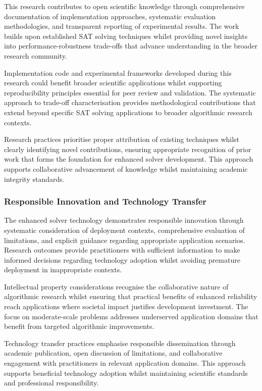 This research contributes to open scientific knowledge through comprehensive documentation of implementation approaches, systematic evaluation methodologies, and transparent reporting of experimental results. The work builds upon established SAT solving techniques whilst providing novel insights into performance-robustness trade-offs that advance understanding in the broader research community.

Implementation code and experimental frameworks developed during this research could benefit broader scientific applications whilst supporting reproducibility principles essential for peer review and validation. The systematic approach to trade-off characterisation provides methodological contributions that extend beyond specific SAT solving applications to broader algorithmic research contexts.

Research practices prioritise proper attribution of existing techniques whilst clearly identifying novel contributions, ensuring appropriate recognition of prior work that forms the foundation for enhanced solver development. This approach supports collaborative advancement of knowledge whilst maintaining academic integrity standards.

\subsubsection{Responsible Innovation and Technology Transfer}

The enhanced solver technology demonstrates responsible innovation through systematic consideration of deployment contexts, comprehensive evaluation of limitations, and explicit guidance regarding appropriate application scenarios. Research outcomes provide practitioners with sufficient information to make informed decisions regarding technology adoption whilst avoiding premature deployment in inappropriate contexts.

Intellectual property considerations recognise the collaborative nature of algorithmic research whilst ensuring that practical benefits of enhanced reliability reach applications where societal impact justifies development investment. The focus on moderate-scale problems addresses underserved application domains that benefit from targeted algorithmic improvements.

Technology transfer practices emphasise responsible dissemination through academic publication, open discussion of limitations, and collaborative engagement with practitioners in relevant application domains. This approach supports beneficial technology adoption whilst maintaining scientific standards and professional responsibility.


